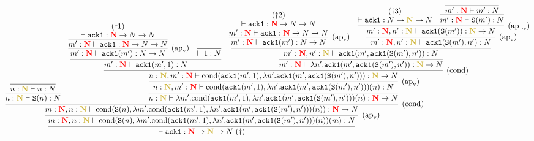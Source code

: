 \begin{center}

{\scriptsize
  \hspace{-3cm}
  $\infer{
    \vdash \AckA:\redN\to\goldN\to\N\ (\dagger)
  }{
    \infer[\Rapv]{
      m:\redN, n:\goldN \vdash \Cond{\Suc{n}}{\lambda m'.\Cond{\AckA(m',1)}{\lambda n'.\AckA(m',\AckA(\Suc{m'},n'))}(n)}(m): \N
    }{
      \infer[\Rcond]{
        m:\redN, n:\goldN \vdash \Cond{\Suc{n}}{\lambda m'.\Cond{\AckA(m',1)}{\lambda n'.\AckA(m',\AckA(\Suc{m'},n'))}(n)}: \redN\to\N
      }{
        \infer{
          n:\goldN \vdash \Suc{n}: \N
        }{
          \infer{
            n:\goldN \vdash n: \N
          }{}
        }
        &
        \infer{
          n:\goldN \vdash \lambda m'.\Cond{\AckA(m',1)}{\lambda n'.\AckA(m',\AckA(\Suc{m'},n'))}(n): \redN\to\N
        }{
          \infer[\Rapv]{
            n:\goldN, m':\redN \vdash \Cond{\AckA(m',1)}{\lambda n'.\AckA(m',\AckA(\Suc{m'},n'))}(n): \N
          }{
            \infer[\Rcond]{
              n:\goldN, m':\redN \vdash \Cond{\AckA(m',1)}{\lambda n'.\AckA(m',\AckA(\Suc{m'},n'))}: \goldN\to\N
            }{
              \infer{
                m':\redN \vdash \AckA(m',1):\N
              }{
                \infer[\Rapv]{
                  m':\redN \vdash \AckA(m'):\N\to\N
                }{
                  \infer{
                    m':\redN \vdash \AckA:\redN\to\N\to\N
                  }{
                    \deduce{
                      \vdash \AckA:\redN\to\N\to\N
                    }{(\dagger1)}
                  }
                }
                &
                \infer{
                  \vdash 1:\N
                }{}
              }
              &
              \infer{
                m':\redN \vdash \lambda n'.\AckA(m',\AckA(\Suc{m'},n')): \goldN\to\N
              }{
                \infer{
                  m':\redN, n':\goldN \vdash \AckA(m',\AckA(\Suc{m'},n')): \N
                }{
                  \infer[\Rapv]{
                    m':\redN \vdash \AckA(m'): \N\to\N
                  }{
                    \infer{
                      m':\redN \vdash \AckA: \redN\to\N\to\N
                    }{
                      \deduce{
                        \vdash \AckA: \redN\to\N\to\N
                      }{(\dagger2)}
                    }
                  }
                  &
                  \infer[\Rapv]{
                    m':\redN, n':\goldN \vdash \AckA(\Suc{m'},n'): \N
                  }{
                    \infer[\RapNv]{
                      m':\redN, n':\goldN \vdash \AckA(\Suc{m'}): \goldN\to\N
                    }{
                      \deduce{
                        \vdash \AckA:\N\to\goldN\to\N
                      }{
                        (\dagger3)
                      }
                      &
                      \infer{
                        m':\redN \vdash \Suc{m'}:\N
                      }{
                        \infer{
                          m':\redN \vdash m':\N
                        }{}
                      }
                    }
                  }
                }
              }
            }
          }
        }
      }
    }
  }$  
}

\end{center}

